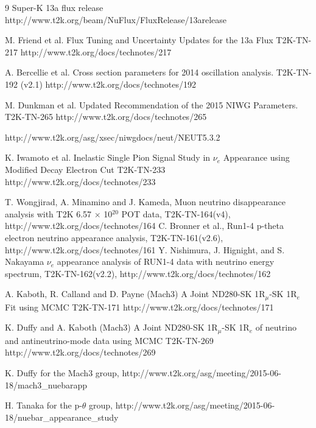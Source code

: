 \begin{thebibliography}{9}
   Super-K 13a flux release
   http://www.t2k.org/beam/NuFlux/FluxRelease/13arelease
   
   M. Friend et al. 
   Flux Tuning and Uncertainty Updates for the 13a Flux
      T2K-TN-217
   http://www.t2k.org/docs/technotes/217
   
   A. Bercellie et al.
   Cross section parameters for 2014 oscillation analysis.
   T2K-TN-192 (v2.1)
   http://www.t2k.org/docs/technotes/192
   
   M. Dunkman et al.
   Updated Recommendation of the 2015 NIWG Parameters.
   T2K-TN-265
   http://www.t2k.org/docs/technotes/265
   
   http://www.t2k.org/asg/xsec/niwgdocs/neut/NEUT5.3.2
   
%
%
  K. Iwamoto et al.
  Inelastic Single Pion Signal Study in \( \nu_{e} \) Appearance using Modified Decay Electron Cut
  T2K-TN-233
  http://www.t2k.org/docs/technotes/233


  T. Wongjirad, A. Minamino and J. Kameda,
  Muon neutrino disappearance analysis with T2K 6.57 $\times$ 10$^{20}$ POT data,
  T2K-TN-164(v4),
  http://www.t2k.org/docs/technotes/164
  C. Bronner et al.,
  Run1-4 p-theta electron neutrino appearance analysis,
  T2K-TN-161(v2.6),
  http://www.t2k.org/docs/technotes/161
  Y. Nishimura, J. Hignight, and S. Nakayama
  $\nu_e$ appearance analysis of RUN1-4 data with neutrino energy spectrum,
  T2K-TN-162(v2.2),
  http://www.t2k.org/docs/technotes/162
  
  A. Kaboth, R. Calland and D. Payne (Mach3)
  A Joint ND280-SK 1$\text{R}_{\mu}$-SK 1$\text{R}_e$ Fit using MCMC 
  T2K-TN-171
  http://www.t2k.org/docs/technotes/171

  K. Duffy and A. Kaboth (Mach3)
  A Joint ND280-SK 1$\text{R}_{\mu}$-SK 1$\text{R}_e$ of neutrino and antineutrino-mode data using MCMC  
  T2K-TN-269
  http://www.t2k.org/docs/technotes/269

K. Duffy for the Mach3 group,
http://www.t2k.org/asg/meeting/2015-06-18/mach3\_nuebarapp

H. Tanaka for the p-$\theta$ group,
http://www.t2k.org/asg/meeting/2015-06-18/nuebar\_appearance\_study


\end{thebibliography}
